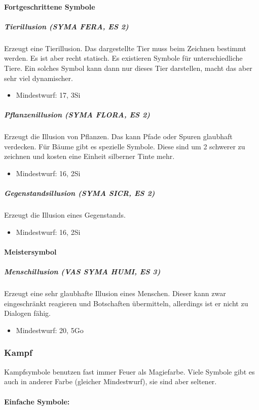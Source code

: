 \documentclass{article}
\begin{document}
\paragraph{Fortgeschrittene Symbole}

\subparagraph{Tierillusion (SYMA FERA, ES 2)}
Erzeugt eine Tierillusion. Das dargestellte Tier muss beim Zeichnen bestimmt werden. Es ist aber recht statisch. Es existieren Symbole für unterschiedliche Tiere. Ein solches Symbol kann dann nur dieses Tier darstellen, macht das aber sehr viel dynamischer.
\begin{itemize}
\item Mindestwurf: 17, 3Si
\end{itemize}

\subparagraph{Pflanzenillusion (SYMA FLORA, ES 2)}
Erzeugt die Illusion von Pflanzen. Das kann Pfade oder Spuren glaubhaft verdecken.
Für Bäume gibt es spezielle Symbole. Diese sind um 2 schwerer zu zeichnen und kosten eine Einheit silberner Tinte mehr.
\begin{itemize}
\item Mindestwurf: 16, 2Si
\end{itemize}

\subparagraph{Gegenstandsillusion (SYMA SICR, ES 2)}
Erzeugt die Illusion eines Gegenstands.
\begin{itemize}
\item Mindestwurf: 16, 2Si
\end{itemize}

\paragraph{Meistersymbol}

\subparagraph{Menschillusion (VAS SYMA HUMI, ES 3)}
Erzeugt eine sehr glaubhafte Illusion eines Menschen. Dieser kann zwar eingeschränkt reagieren und Botschaften übermitteln, allerdings ist er nicht zu Dialogen fähig.
\begin{itemize}
\item Mindestwurf: 20, 5Go
\end{itemize}

\subsubsection{Kampf}
Kampfsymbole benutzen fast immer Feuer als Magiefarbe. Viele Symbole gibt es auch in anderer Farbe (gleicher Mindestwurf), sie sind aber seltener.

\paragraph{Einfache Symbole:}
\end{document}
